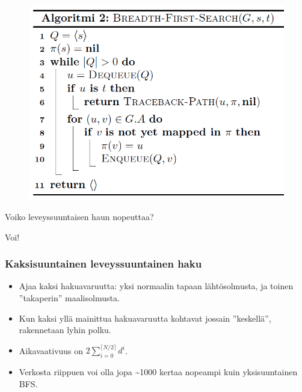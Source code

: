\documentclass{beamer}
\begin{document}
\begin{frame}
\begin{figure}[H]
  \includegraphics[width=\textwidth,keepaspectratio]{bfs}
\end{figure}
\end{frame}

\begin{frame}
Voiko leveyssuuntaisen haun nopeuttaa?
\end{frame}

\begin{frame}
Voi!
\end{frame}

\begin{frame}
\frametitle{Kaksisuuntainen leveyssuuntainen haku}
\begin{itemize}
  \item Ajaa kaksi hakuavaruutta: yksi normaalin tapaan lähtösolmusta, ja toinen ''takaperin'' maalisolmusta.
  \item Kun kaksi yllä mainittua hakuavaruutta kohtavat jossain ''keskellä'', rakennetaan lyhin polku.
  \item Aikavaativuus on $2\sum_{i = 0}^{\lceil N / 2\rceil} d^i$.
  \item Verkosta riippuen voi olla jopa \textasciitilde 1000 kertaa nopeampi kuin yksisuuntainen BFS.
\end{itemize}
\end{frame}
\end{document}
